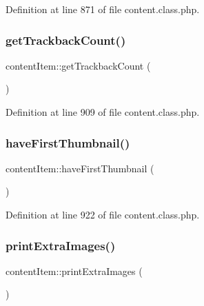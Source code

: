 Definition at line 871 of file content.\+class.\+php.

\hypertarget{classcontentItem_a197f56732733f1487d26ed23d29e94a6}{}\label{classcontentItem_a197f56732733f1487d26ed23d29e94a6} 
\subsubsection{\texorpdfstring{get\+Trackback\+Count()}{getTrackbackCount()}}
{\footnotesize\ttfamily content\+Item\+::get\+Trackback\+Count (\begin{DoxyParamCaption}{ }\end{DoxyParamCaption})}



Definition at line 909 of file content.\+class.\+php.

\hypertarget{classcontentItem_a9e7fa4b2b4b3ce4a066d89b7f862be5a}{}\label{classcontentItem_a9e7fa4b2b4b3ce4a066d89b7f862be5a} 
\subsubsection{\texorpdfstring{have\+First\+Thumbnail()}{haveFirstThumbnail()}}
{\footnotesize\ttfamily content\+Item\+::have\+First\+Thumbnail (\begin{DoxyParamCaption}{ }\end{DoxyParamCaption})}



Definition at line 922 of file content.\+class.\+php.

\hypertarget{classcontentItem_acdff242f3298021a7ac9274a4191ebc7}{}\label{classcontentItem_acdff242f3298021a7ac9274a4191ebc7} 
\subsubsection{\texorpdfstring{print\+Extra\+Images()}{printExtraImages()}}
{\footnotesize\ttfamily content\+Item\+::print\+Extra\+Images (\begin{DoxyParamCaption}{ }\end{DoxyParamCaption})}



